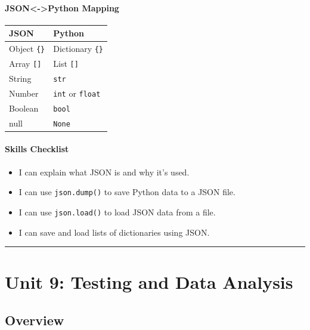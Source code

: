 \documentclass[
  justified,
  openright,
]{tufte-book}
\let\subsubsection\paragraph
\let\paragraph\paragraph
\let\subsubsection\paragraph
\let\paragraph\paragraph
\providecommand{\tightlist}{%
  \setlength{\itemsep}{0pt}\setlength{\parskip}{0pt}}
\begin{document}
\subsubsection{JSON\textless-\textgreater Python
Mapping}\label{json-python-mapping}

{\def\LTcaptype{none} %
\begin{longtable}[]{@{}ll@{}}
\toprule\noalign{}
JSON & Python \\
\midrule\noalign{}
\endhead
\bottomrule\noalign{}
\endlastfoot
Object \texttt{\{\}} & Dictionary \texttt{\{\}} \\
Array \texttt{{[}{]}} & List \texttt{{[}{]}} \\
String & \texttt{str} \\
Number & \texttt{int} or \texttt{float} \\
Boolean & \texttt{bool} \\
null & \texttt{None} \\
\end{longtable}
}

\subsubsection{Skills Checklist}\label{skills-checklist-41}

\begin{itemize}
\tightlist
\item[$\square$]
  I can explain what JSON is and why it's used.
\item[$\square$]
  I can use \texttt{json.dump()} to save Python data to a JSON file.
\item[$\square$]
  I can use \texttt{json.load()} to load JSON data from a file.
\item[$\square$]
  I can save and load lists of dictionaries using JSON.
\end{itemize}

\begin{center}\rule{0.5\linewidth}{0.5pt}\end{center}

\section{Unit 9: Testing and Data
Analysis}\label{unit-9-testing-and-data-analysis-1}

\subsection{Overview}\label{overview-9}
\end{document}
